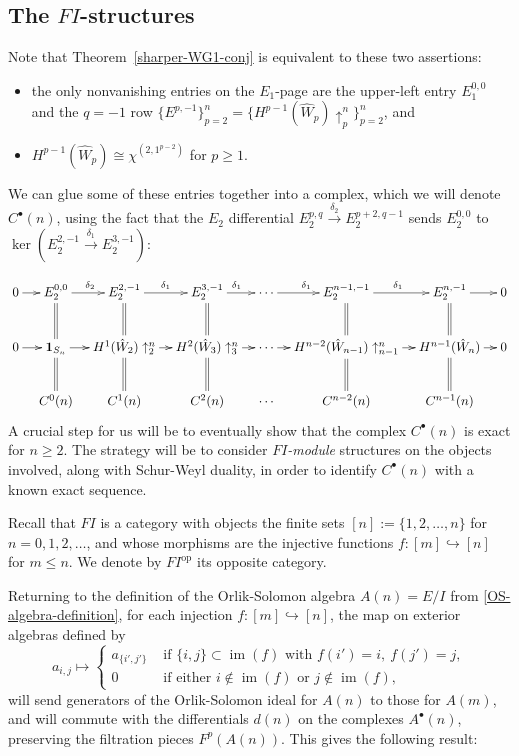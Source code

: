 \documentclass[12pt]{amsart}
\theoremstyle{plain}
\theoremstyle{definition}
\begin{document}
\subsection{The $FI$-structures}
Note that Theorem~\ref{sharper-WG1-conj} is equivalent to these two assertions:
\begin{itemize}
\item
the only nonvanishing entries on the $E_1$-page
are the upper-left entry $E_1^{0,0}$ and the $q=-1$ row
$\{E^{p,-1}\}_{p=2}^n=\{H^{p-1}(\hat{W}_p)\uparrow_{p}^{n}\}_{p=2}^{n}$, and
\item 
$H^{p-1}(\hat{W}_p)\cong \chi^{(2,1^{p-2})}$ for $p \geq 1$.
\end{itemize}
We can glue some of these entries together into a complex, which
we will denote $C^\bullet(n)$, using the fact that
the $E_2$ differential 
$E_2^{p,q}\overset{\delta_2}{\rightarrow} E_2^{p+2,q-1}$
sends 
$E_2^{0,0}$ to $\ker(E_2^{2,-1} \overset{\delta_1}{\rightarrow} E_2^{3,-1})$:

\begin{equation*}
\xymatrix@C=0.8pc{
0 \ar[r]
&E_2^{0,0} \ar[r]^{\delta_2} \ar@{=}[d] 
&E_2^{2,-1} \ar[r]^{\delta_1} \ar@{=}[d] 
&E_2^{3,-1} \ar[r]^{\delta_1} \ar@{=}[d] 
&\cdots\ar[r]^{\delta_1}
&E_2^{n-1,-1} \ar[r]^{\delta_1} \ar@{=}[d] 
&E_2^{n,-1} \ar[r] \ar@{=}[d] 
&0 \\
0 \ar[r]
&{{\mathbf{1}}}_{S_n} \ar[r]
&H^{1}(\hat{W}_2)\uparrow_{2}^{n} \ar[r]
&H^{2}(\hat{W}_3)\uparrow_{3}^{n} \ar[r]
& \cdots\ar[r]
&H^{n-2}(\hat{W}_{n-1})\uparrow_{n-1}^{n} \ar[r]
&H^{n-1}(\hat{W}_n)\ar[r]
&0\\
&C^0(n)\ar@{=}[u]
&C^1(n)\ar@{=}[u]
&C^2(n)\ar@{=}[u]
&\cdots
&C^{n-2}(n)\ar@{=}[u]
&C^{n-1}(n)\ar@{=}[u]
&
}
\end{equation*}
A crucial step for us will be to eventually show that the complex $C^\bullet(n)$ is exact for $n \geq 2$. The strategy will be to consider {\it $FI$-module} structures
on the objects involved, along with Schur-Weyl duality,
in order to identify $C^\bullet(n)$ with a known exact sequence.

Recall \cite[Def. 1.1]{CEF} 
that $FI$ is a category with objects the
finite sets $[n]:=\{1,2,\ldots,n\}$ for $n=0,1,2,\ldots$, and
whose morphisms are the injective functions
$f \colon [m] \hookrightarrow [n]$ for $m \leq n$.
We denote by $FI^{{\operatorname{op}}}$ its opposite category.

Returning to the definition of the Orlik-Solomon algebra $A(n)=E/I$ from
\eqref{OS-algebra-definition}, for 
each injection $f \colon [m] \hookrightarrow [n]$,
the map on exterior algebras defined by
$$
a_{i,j}\mapsto 
\begin{cases}
a_{\{i',j'\}}&\text{ if } \{i,j\} \subset {{\operatorname{im}}}(f)\text{ with }f(i')=i,\ f(j')=j,\\
0&\text{ if either }i\not\in {{\operatorname{im}}}(f) \text{ or }j \not\in {{\operatorname{im}}}(f),
\end{cases}
$$
will send generators of the Orlik-Solomon ideal for $A(n)$ to those
for $A(m)$, and will commute with the
differentials $d(n)$ on the complexes $A^\bullet(n)$,
preserving the filtration pieces $F^p(A(n))$.  This gives the following result:
\end{document}
